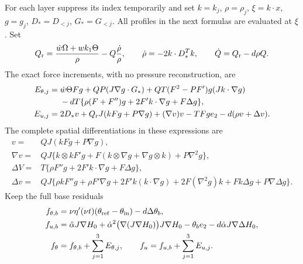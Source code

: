 For each layer suppress its index temporarily and set
$k=k_j$, $\rho=\rho_j$, $\xi=k\cdot x$, $g=g_j$,
$D_*=D_{<j}$, $G_*=G_{<j}$. All profiles in the next formulas
are evaluated at $\xi$. Set
\begin{equation}\label{cvlane:tts:Qrest}
 Q_{\rm r}=\frac{\dot w\Omega+w k_1\Theta}{\rho}
                    -Q\frac{\dot\rho}{\rho},\qquad
 \dot\rho=-2k\cdot D_*^Tk,
 \qquad\dot Q=Q_{\rm r}-d\rho Q.
\end{equation}
The exact force increments, with no pressure reconstruction, are
\begin{align}\label{cvlane:tts:scalarforce}
 E_{\theta,j}={}&\dot w\Theta Fg+QP(J\nabla g\cdot G_*)
           +QT(F^2-PF')g(Jk\cdot\nabla g)\nonumber\\
 &-dT\{\rho(F+F'')g+2F'k\cdot\nabla g+F\Delta g\},\\
 E_{u,j}={}&2D_*v+Q_{\rm r}J(kFg+P\nabla g)
          +(\nabla v)v-TFg e_2-d(\rho v+\Delta v).
 \label{cvlane:tts:vectorforce}
\end{align}
The complete spatial differentiations in these expressions are
\begin{align}\label{cvlane:tts:spatialjets}
 v={}&QJ(kFg+P\nabla g),\nonumber\\
 \nabla v={}&QJ\{k\otimes k F'g+
 F(k\otimes\nabla g+\nabla g\otimes k)+P\nabla^2g\},\\
 \Delta V={}&T\{\rho F''g+2F'k\cdot\nabla g+F\Delta g\},
 \nonumber\\
 \Delta v={}&QJ\{\rho kF''g+\rho F'\nabla g
       +2F'k(k\cdot\nabla g)+2F(\nabla^2g)k
       +Fk\Delta g+P\nabla\Delta g\}.
 \nonumber
\end{align}
Keep the full base residuals
\begin{align}\label{cvlane:tts:baseforce}
 f_{\theta,b}&=\nu\eta'(\nu t)(\theta_{\rm ref}-\theta_{\rm in})
                                      -d\Delta\theta_b,\nonumber\\
 f_{u,b}&=\ddot\alpha J\nabla H_0
    +\dot\alpha^2\bigl(\nabla(J\nabla H_0)\bigr)J\nabla H_0
    -\theta_b e_2-d\dot\alpha J\nabla\Delta H_0,\\
 f_\theta&=f_{\theta,b}+\sum_{j=1}^3E_{\theta,j},\qquad
 f_u=f_{u,b}+\sum_{j=1}^3E_{u,j}.\nonumber
\end{align}

